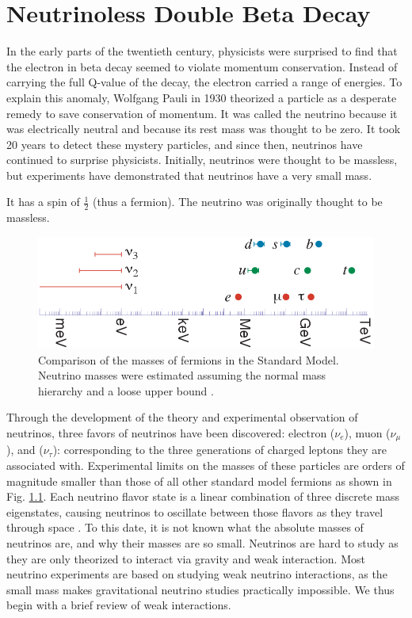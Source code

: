 \chapter{Neutrinoless Double Beta Decay}
In the early parts of the twentieth century, physicists were surprised to find that the electron in beta decay seemed to violate momentum conservation. Instead of carrying the full Q-value of the decay, the electron carried a range of energies. To explain this anomaly, Wolfgang Pauli in 1930 theorized a particle as a desperate remedy to save conservation of momentum. It was called the neutrino because it was electrically neutral and because its rest mass was thought to be zero. It took 20 years to detect these mystery particles, and since then, neutrinos have continued to surprise physicists. Initially, neutrinos were thought to be massless, but experiments have demonstrated that neutrinos have a very small mass.

It has a spin of $\frac{1}{2}$ (thus a fermion). The neutrino was originally thought to be massless. 
\begin{figure}[!htb]
\centering
\includegraphics[width=\linewidth]{ch1/figs/n_mass_comp.png}
\caption{Comparison of the masses of fermions in the Standard Model. Neutrino masses were estimated assuming the normal mass hierarchy and a loose upper bound \cite{Hewett:2012ns}.}
\label{n_mass_comp}
\end{figure}

Through the development of the theory and experimental observation of neutrinos, three favors of neutrinos have been discovered: electron ($\nu_e$), muon ($\nu_{\mu}$), and ($\nu_{\tau}$): corresponding to the three generations of charged leptons they are associated with. Experimental limits on the masses of these particles are orders of magnitude smaller than those of all other standard model fermions as shown in Fig. \ref{n_mass_comp}. Each neutrino flavor state is a linear combination of three discrete mass eigenstates, causing neutrinos to oscillate between those flavors as they travel through space \cite{Super_Kamiokande_1998kpq}. To this date, it is not known what the absolute masses of neutrinos are, and why their masses are so small. Neutrinos are hard to study as they are only theorized to interact via gravity and weak interaction. Most neutrino experiments are based on studying weak neutrino interactions, as the small mass makes gravitational neutrino studies practically impossible. We thus begin with a brief review of weak interactions.


